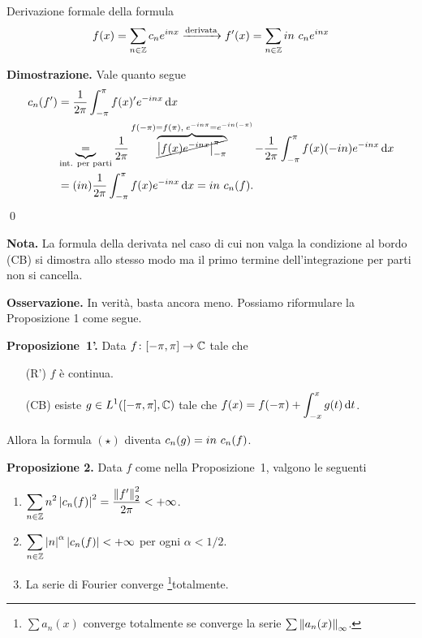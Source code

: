 Derivazione formale della formula
%
$$
	f(x) = \sum_{n \in \mathbb Z} c_n e^{inx} \xrightarrow{\text{derivata}} f'(x) = \sum_{n \in \mathbb Z} in \ c_n e^{inx} 
$$
%

\textbf{Dimostrazione.} Vale quanto segue
\begin{align*}
	c_n(f') & = \frac{1}{2\pi} \int_{-\pi}^\pi f(x)' e^{-inx} \,\mathrm{d} x \\
	& \underbrace{=}_{\text{int. per parti}} \frac{1}{2\pi} \overbrace{\cancel{\left| f(x) e^{-inx} \right|_{-\pi}^\pi}}^{f(-\pi) = f(\pi), \; e^{-in\pi} = e^{-in (-\pi)}} - \frac{1}{2\pi} \int_{-\pi}^\pi f(x) (-in) e^{-inx} \,\mathrm{d} x \\
	& = (in) \frac{1}{2\pi} \int_{-\pi}^\pi f(x) e^{-inx} \,\mathrm{d} x = in \ c_n(f).
\end{align*} 
\qed

\textbf{Nota.} La formula della derivata nel caso di cui non valga la condizione al bordo (CB) si dimostra allo stesso modo ma il primo termine dell'integrazione per parti non si cancella. 

\textbf{Osservazione.} In verità, basta ancora meno. Possiamo riformulare la Proposizione 1 come segue.

\textbf{Proposizione~1'.} Data $f \colon [-\pi,\pi] \to \mathbb C$ tale che
\begin{itemize}
	\item[(R')] $f$ è continua.

	\item[(CB)] esiste $\displaystyle g \in L^1([-\pi,\pi], \mathbb C)$ tale che $\displaystyle f(x) = f(-\pi) + \int_{-x}^x g(t) \,\mathrm{d} t $.

\end{itemize}
Allora la formula $(\star)$ diventa $\displaystyle c_n(g) = in \ c_n(f)$.

\vs

\textbf{Proposizione 2.} Data $f$ come nella Proposizione~1, valgono le seguenti
\begin{enumerate}
\item $\displaystyle \sum_{n \in \mathbb Z} n^2 \left| c_n(f) \right|^2 = \frac{\left\lVert f' \right\rVert_2^2}{2\pi} < +\infty$.

\item $\displaystyle \sum_{n \in \mathbb Z} \left| n \right|^\alpha \left| c_n(f) \right| < +\infty $ per ogni $\alpha < 1/2$.

\item La serie di Fourier converge \footnote{$\sum a_n(x)$ converge totalmente se converge la serie $\sum \left\lVert a_n (x) \right\rVert_\infty$.}{totalmente}.
\end{enumerate}

